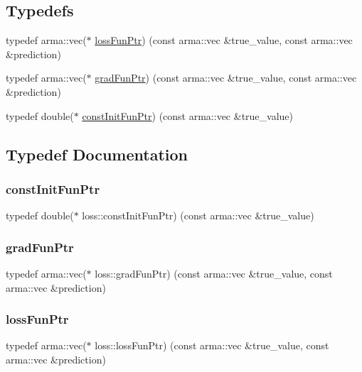 \subsection*{Typedefs}
\begin{DoxyCompactItemize}
\item 
typedef arma\+::vec($\ast$ \hyperlink{namespaceloss_a6658cb84c8687d6dd0904c00801542f3}{loss\+Fun\+Ptr}) (const arma\+::vec \&true\+\_\+value, const arma\+::vec \&prediction)
\item 
typedef arma\+::vec($\ast$ \hyperlink{namespaceloss_acae0785d794ff7cc1b1242bab23f81c6}{grad\+Fun\+Ptr}) (const arma\+::vec \&true\+\_\+value, const arma\+::vec \&prediction)
\item 
typedef double($\ast$ \hyperlink{namespaceloss_af21a5d5ed7431ecbc73730ce2bde3987}{const\+Init\+Fun\+Ptr}) (const arma\+::vec \&true\+\_\+value)
\end{DoxyCompactItemize}


\subsection{Typedef Documentation}
\mbox{\label{namespaceloss_af21a5d5ed7431ecbc73730ce2bde3987}} 
\subsubsection{\texorpdfstring{const\+Init\+Fun\+Ptr}{constInitFunPtr}}
{\footnotesize\ttfamily typedef double($\ast$ loss\+::const\+Init\+Fun\+Ptr) (const arma\+::vec \&true\+\_\+value)}

\mbox{\label{namespaceloss_acae0785d794ff7cc1b1242bab23f81c6}} 
\subsubsection{\texorpdfstring{grad\+Fun\+Ptr}{gradFunPtr}}
{\footnotesize\ttfamily typedef arma\+::vec($\ast$ loss\+::grad\+Fun\+Ptr) (const arma\+::vec \&true\+\_\+value, const arma\+::vec \&prediction)}

\mbox{\label{namespaceloss_a6658cb84c8687d6dd0904c00801542f3}} 
\subsubsection{\texorpdfstring{loss\+Fun\+Ptr}{lossFunPtr}}
{\footnotesize\ttfamily typedef arma\+::vec($\ast$ loss\+::loss\+Fun\+Ptr) (const arma\+::vec \&true\+\_\+value, const arma\+::vec \&prediction)}

